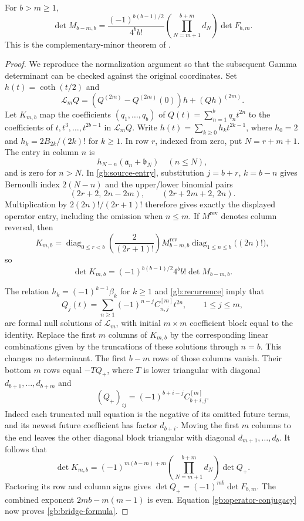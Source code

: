 \begin{proposition}
\label{gb:bridge}
For $b>m\ge1$,
\begin{equation}\label{gb:bridge-formula}
 \boxed{\displaystyle
 \det M_{b-m,b}
 =\frac{(-1)^{b(b-1)/2}}{4^bb!}
       \left(\prod_{N=m+1}^{b+m}d_N\right)\det F_{b,m}.}
\end{equation}
This is the complementary-minor theorem of
\cite[Theorem~\texttt{gap:complementary}]{repo-gamma}.
\end{proposition}

\begin{proof}
We reproduce the normalization argument so that the subsequent
Gamma determinant can be checked against the original coordinates.
Set $h(t)=\coth(t/2)$ and
\[
 \mathcal L_mQ=(Q^{(2m)}-Q^{(2m)}(0))h+(Qh)^{(2m)}.
\]
Let $K_{m,b}$ map the coefficients $(q_1,\ldots,q_b)$ of
$Q(t)=\sum_{n=1}^bq_nt^{2n}$ to the coefficients of
$t,t^3,\ldots,t^{2b-1}$ in $\mathcal L_mQ$.
Write $h(t)=\sum_{k\ge0}h_kt^{2k-1}$, where $h_0=2$ and
$h_k=2B_{2k}/(2k)!$ for $k\ge1$.  In row $r$, indexed from zero,
put $N=r+m+1$.  The entry in column $n$ is
\[
 h_{N-n}(\mathfrak a_n+\mathfrak b_N)\quad(n\le N),
\]
and is zero for $n>N$.  In \eqref{gb:source-entry}, substitution
$j=b+r$, $k=b-n$ gives Bernoulli index $2(N-n)$ and the upper/lower
binomial pairs
\[
 (2r+2,\,2n-2m),\qquad(2r+2m+2,\,2n).
\]
Multiplication by $2(2n)!/(2r+1)!$ therefore gives exactly the
displayed operator entry, including the omission when $n\le m$.
If $M^{\mathrm{rev}}$ denotes column reversal, then
\[
 K_{m,b}=
 \operatorname{diag}_{0\le r<b}\!\left(\frac2{(2r+1)!}\right)
 M_{b-m,b}^{\mathrm{rev}}
 \operatorname{diag}_{1\le n\le b}\!\bigl((2n)!\bigr),
\]
so
\begin{equation}\label{gb:operator-conjugacy}
 \det K_{m,b}=(-1)^{b(b-1)/2}4^bb!\det M_{b-m,b}.
\end{equation}

The relation $h_k=(-1)^{k-1}\beta_k$ for $k\ge1$ and
\eqref{gb:recurrence} imply that
\[
 Q_j(t)=\sum_{n\ge1}(-1)^{n-j}C^{[m]}_{n,j}t^{2n},
 \qquad1\le j\le m,
\]
are formal null solutions of $\mathcal L_m$, with initial
$m\times m$ coefficient block equal to the identity.  Replace
the first $m$ columns of $K_{m,b}$ by the corresponding linear
combinations given by the truncations of these solutions through
$n=b$.  This changes no determinant.  The first $b-m$ rows of
those columns vanish.  Their bottom $m$ rows equal $-TQ_+$, where
$T$ is lower triangular with diagonal $d_{b+1},\ldots,d_{b+m}$ and
\[
 (Q_+)_{ij}=(-1)^{b+i-j}C^{[m]}_{b+i,j}.
\]
Indeed each truncated null equation is the negative of its omitted
future terms, and its newest future coefficient has factor $d_{b+i}$.
Moving the first $m$ columns to the end leaves the other diagonal
block triangular with diagonal $d_{m+1},\ldots,d_b$.  It follows that
\[
 \det K_{m,b}=(-1)^{m(b-m)+m}
       \left(\prod_{N=m+1}^{b+m}d_N\right)\det Q_+.
\]
Factoring its row and column signs gives
$\det Q_+=(-1)^{mb}\det F_{b,m}$.  The combined exponent
$2mb-m(m-1)$ is even.  Equation \eqref{gb:operator-conjugacy}
now proves \eqref{gb:bridge-formula}.
\end{proof}

